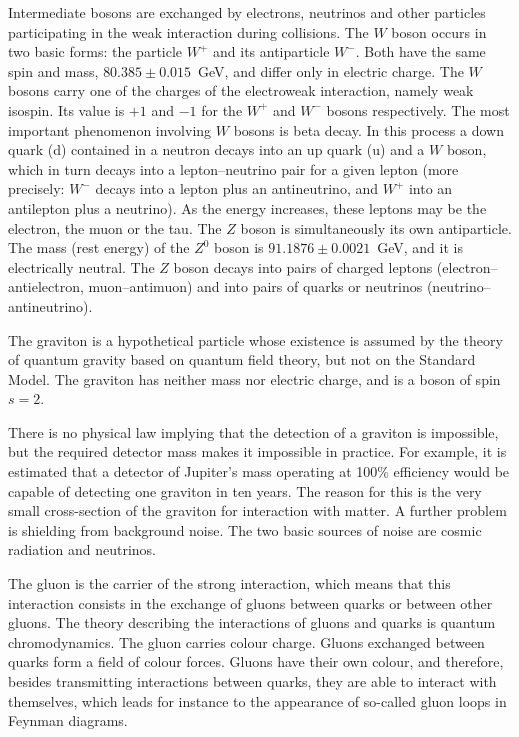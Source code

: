 Intermediate bosons are exchanged by electrons, neutrinos and other particles participating in the weak interaction during collisions. The $W$ boson occurs in two basic forms: the particle $W^+$ and its antiparticle $W^-$. Both have the same spin and mass, $80.385 \pm 0.015$~GeV, and differ only in electric charge. The $W$ bosons carry one of the charges of the electroweak interaction, namely weak isospin. Its value is $+1$ and $-1$ for the $W^+$ and $W^-$ bosons respectively. The most important phenomenon involving $W$ bosons is beta decay. In this process a down quark (d) contained in a neutron decays into an up quark (u) and a $W$ boson, which in turn decays into a lepton--neutrino pair for a given lepton (more precisely: $W^-$ decays into a lepton plus an antineutrino, and $W^+$ into an antilepton plus a neutrino). As the energy increases, these leptons may be the electron, the muon or the tau. The $Z$ boson is simultaneously its own antiparticle. The mass (rest energy) of the $Z^0$ boson is $91.1876 \pm 0.0021$~GeV, and it is electrically neutral. The $Z$ boson decays into pairs of charged leptons (electron--antielectron, muon--antimuon) and into pairs of quarks or neutrinos (neutrino--antineutrino).

The graviton is a hypothetical particle whose existence is assumed by the theory of quantum gravity based on quantum field theory, but not on the Standard Model. The graviton has neither mass nor electric charge, and is a boson of spin $s = 2$.

There is no physical law implying that the detection of a graviton is impossible, but the required detector mass makes it impossible in practice. For example, it is estimated that a detector of Jupiter's mass operating at 100\% efficiency would be capable of detecting one graviton in ten years. The reason for this is the very small cross-section of the graviton for interaction with matter. A further problem is shielding from background noise. The two basic sources of noise are cosmic radiation and neutrinos.

The gluon is the carrier of the strong interaction, which means that this interaction consists in the exchange of gluons between quarks or between other gluons. The theory describing the interactions of gluons and quarks is quantum chromodynamics. The gluon carries colour charge. Gluons exchanged between quarks form a field of colour forces. Gluons have their own colour, and therefore, besides transmitting interactions between quarks, they are able to interact with themselves, which leads for instance to the appearance of so-called gluon loops in Feynman diagrams.

